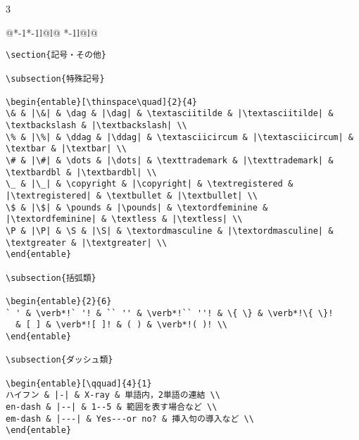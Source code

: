 \documentclass[10pt,a4paper,landscape,dvipdfmx]{jarticle}
\makeatletter
\def\set@etsep#1#2{\def\etcolsep{#1}\def\etitemsep{#2}}
\newenvironment{entable}[3][\quad\qquad]{%
  \set@etsep#1\relax\relax
  \begin{tabular}{%
    @{}*{\the\numexpr#3-1}{*{\the\numexpr#2-1}{l@{\etcolsep}}l@{\etitemsep}}%
    *{\the\numexpr#2-1}{l@{\etcolsep}}l@{}}}{%
  \end{tabular}}
\makeatother
\begin{document}
\begin{multicols}{3}
\begin{entable}[\enspace]{2}{1}
\begin{verbatim}
\section{記号・その他}

\subsection{特殊記号}

\begin{entable}[\thinspace\quad]{2}{4}
\& & |\&| & \dag & |\dag| & \textasciitilde & |\textasciitilde| & \textbackslash & |\textbackslash| \\
\% & |\%| & \ddag & |\ddag| & \textasciicircum & |\textasciicircum| & \textbar & |\textbar| \\
\# & |\#| & \dots & |\dots| & \texttrademark & |\texttrademark| & \textbardbl & |\textbardbl| \\
\_ & |\_| & \copyright & |\copyright| & \textregistered & |\textregistered| & \textbullet & |\textbullet| \\
\$ & |\$| & \pounds & |\pounds| & \textordfeminine & |\textordfeminine| & \textless & |\textless| \\
\P & |\P| & \S & |\S| & \textordmasculine & |\textordmasculine| & \textgreater & |\textgreater| \\
\end{entable}

\subsection{括弧類}

\begin{entable}{2}{6}
` ' & \verb*!` '! & `` '' & \verb*!`` ''! & \{ \} & \verb*!\{ \}!
  & [ ] & \verb*![ ]! & ( ) & \verb*!( )! \\
\end{entable}

\subsection{ダッシュ類}

\begin{entable}[\qquad]{4}{1}
ハイフン & |-| & X-ray & 単語内，2単語の連結 \\
en-dash & |--| & 1--5 & 範囲を表す場合など \\
em-dash & |---| & Yes---or no? & 挿入句の導入など \\
\end{entable}


\end{verbatim}
\end{entable}
\end{multicols}
\end{document}
